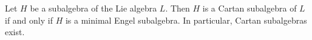 Let $H$ be a subalgebra of the Lie algebra $L$. Then $H$ is a Cartan subalgebra of $L$ if and only if $H$ is a minimal Engel subalgebra. In particular, Cartan subalgebras exist.
